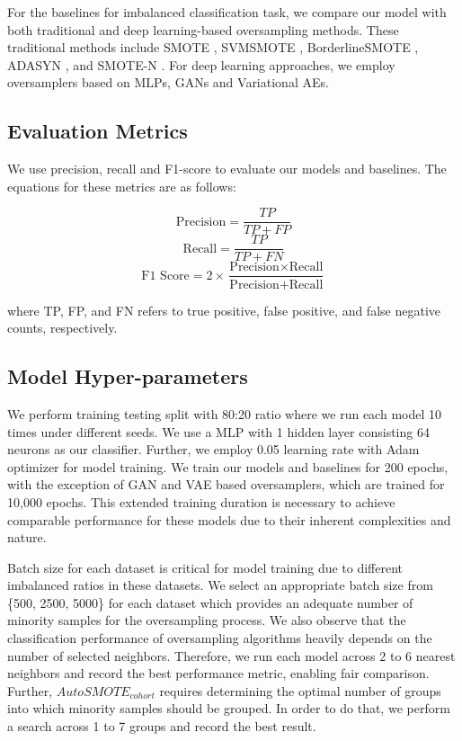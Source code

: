 For the baselines for imbalanced classification task, we compare our model with both traditional and deep learning-based oversampling methods. These traditional methods include SMOTE \cite{chawla2002smote}, SVMSMOTE \cite{tang2008svms}, BorderlineSMOTE \cite{han2005borderline}, ADASYN \cite{he2008adasyn}, and SMOTE-N \cite{chawla2002smote}. For deep learning approaches, we employ oversamplers based on MLPs, GANs and Variational AEs.

\subsection{Evaluation Metrics}

We use precision, recall and F1-score \cite{wardhani2019cross} to evaluate our models and baselines. The equations for these metrics are as follows:

\[ \text{Precision} = \frac{TP}{TP + FP}
 \]
\[ \text{Recall} = \frac{TP}{TP + FN} \]
\[ \text{F1 Score} = 2 \times \frac{\text{Precision} \times\text{Recall}}{\text{Precision} + \text{Recall}}
 \]

where TP, FP, and FN refers to true positive, false positive, and false negative counts, respectively.


\subsection{Model Hyper-parameters}

We perform training testing split with 80:20 ratio where we run each model 10 times under different seeds. We use a MLP with 1 hidden layer consisting 64 neurons as our classifier.  Further, we employ 0.05 learning rate with Adam optimizer \cite{kingma2014adam} for model training. We train our models and baselines for 200 epochs, with the exception of GAN and VAE based oversamplers, which are trained for 10,000 epochs. This extended training duration is necessary to achieve comparable performance for these models due to their inherent complexities and nature.

Batch size for each dataset is critical for model training due to different imbalanced ratios in these datasets. We select an appropriate batch size from \{500, 2500, 5000\} for each dataset which provides an adequate number of minority samples for the oversampling process. We also observe that the classification performance of oversampling algorithms heavily depends on the number of selected neighbors. Therefore, we run each model across 2 to 6 nearest neighbors and record the best performance metric, enabling fair comparison. Further, $AutoSMOTE_{cohort}$ requires determining the optimal number of groups into which minority samples should be grouped. In order to do that, we perform a search across 1 to 7 groups and record the best result.

